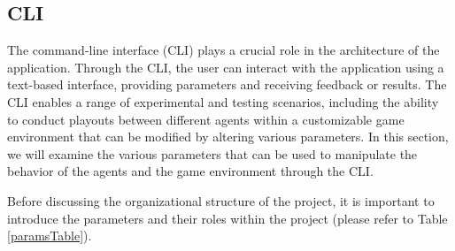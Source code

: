 \subsection{CLI}
\label{CLI}

The command-line interface (CLI) plays a crucial role in the architecture of the application. Through the CLI, the user can interact with the application using a text-based interface, providing parameters and receiving feedback or results. The CLI enables a range of experimental and testing scenarios, including the ability to conduct playouts between different agents within a customizable game environment that can be modified by altering various parameters. In this section, we will examine the various parameters that can be used to manipulate the behavior of the agents and the game environment through the CLI.

Before discussing the organizational structure of the project, it is important to introduce the parameters and their roles within the project (please refer to Table \ref{paramsTable}).

\begin{table}
\captionsetup{justification=centering}
\begin{center}
\end{center}
\caption{\label{paramsTable} Command-line parameters}
\end{table}

